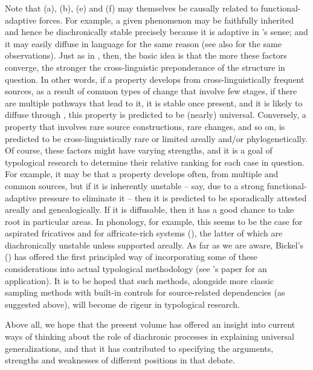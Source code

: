 \documentclass[output=paper]{langsci/langscibook}
\begin{document}
Note that (a), (b), (e) and (f) may themselves be causally related to functional-adaptive forces. For example, a given phenomenon may be faithfully inherited and hence be diachronically stable precisely because it is adaptive in ’s sense; and it may easily diffuse in language  for the same reason (see also \citealt{Bickel2013,Bickel2017} for the same observations). 
Just as in \citet{Greenberg1978_Diachr}, then, the basic idea is that the more these factors converge, the stronger the cross-linguistic preponderance of the structure in question. In other words, if a property develops from cross-linguistically frequent sources, as a result of common types of change that involve few stages, if there are multiple pathways that lead to it, it is stable once present, and it is likely to diffuse through , this property is predicted to be (nearly) universal. Conversely, a property that involves rare source constructions, rare changes, and so on, is predicted to be cross-linguistically rare or limited areally and/or phylogenetically. Of course, these factors might have varying strengths, and it is a goal of typological research to determine their relative ranking for each case in question. For example, it may be that a property develops often, from multiple and common sources, but if it is inherently unstable – say, due to a strong functional-adaptive pressure to eliminate it – then it is predicted to be sporadically attested areally and genealogically. If it is diffusable, then it has a good chance to take root in particular areas. In phonology, for example, this seems to be the case for aspirated fricatives \citep{Jacques2011} and for affricate-rich systems (\citealt{NikolaevGrossman2018}), the latter of which are diachronically unstable unless supported areally. As far as we are aware, Bickel’s (\citeyear{Bickel2011_Modelling,Bickel2013})  has offered the first principled way of incorporating some of these considerations into actual typological methodology (see 's paper for an application). It is to be hoped that such methods, alongside more classic sampling methods with built-in controls for source-related dependencies (as suggested above), will become de rigeur in  typological research.

Above all, we hope that the present volume has offered an insight into current ways of thinking about the role of diachronic processes in explaining universal generalizations, and that it has contributed to specifying the arguments, strengths and weaknesses of different positions in that debate.

\sloppy
\printbibliography[heading=subbibliography,notkeyword=this]
\end{document}
